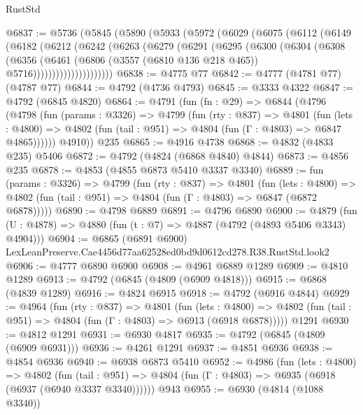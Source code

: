 \begin{lexlean}{RustStd}
\begin{coremodule}
@6837 := @5736
    (@5845
      (@5890
        (@5933
          (@5972
            (@6029
              (@6075
                (@6112
                  (@6149
                    (@6182
                      (@6212
                        (@6242
                          (@6263
                            (@6279
                              (@6291
                                (@6295
                                  (@6300
                                    (@6304
                                      (@6308
                                        (@6356
                                          (@6461
                                            (@6806
                                              (@3557 (@6810 @136 @218 @465))
                                              @5716)))))))))))))))))))))
@6838 := @4775 @77
@6842 := @4777 (@4781 @77) (@4787 @77)
@6844 := @4792 (@4736 @4793)
@6845 := @3333 @4322
@6847 := @4792 (@6845 @4820)
@6864 := @4791
    (fun (fn : @29) =>
    @6844
      (@4796
        (@4798
          (fun (params : @3326) =>
          @4799
            (fun (rty : @837) =>
            @4801
              (fun (lets : @4800) =>
              @4802 (fun (tail : @951) => @4804 (fun (Γ : @4803) => @6847 @4865))))))
        @4910))
    @235
@6865 := @4916 @4738
@6868 := @4832 (@4833 @235) @5406
@6872 := @4792 (@4824 (@6868 @4840) @4844)
@6873 := @4856 @235
@6878 := @4853 (@4855 @6873 @5410 @3337 @3340)
@6889 := fun (params : @3326) =>
  @4799
    (fun (rty : @837) =>
    @4801
      (fun (lets : @4800) =>
      @4802 (fun (tail : @951) => @4804 (fun (Γ : @4803) => @6847 (@6872 @6878)))))
@6890 := @4798 @6889
@6891 := @4796 @6890
@6900 := @4879 (fun (U : @4878) => @4880 (fun (t : @7) => @4887 (@4792 (@4893 @5406 @3343) @4904)))
@6904 := @6865 (@6891 @6900) LexLeanPreserve.Cae4456d77aa62528ed0bd9d0612cd278.R38.RustStd.look2
@6906 := @4777 @6890 @6900
@6908 := @4961 @6889 @1289
@6909 := @4810 @1289
@6913 := @4792 (@6845 (@4809 (@6909 @4818)))
@6915 := @6868 (@4839 @1289)
@6916 := @4824 @6915
@6918 := @4792 (@6916 @4844)
@6929 := @4964
    (fun (rty : @837) =>
    @4801
      (fun (lets : @4800) =>
      @4802 (fun (tail : @951) => @4804 (fun (Γ : @4803) => @6913 (@6918 @6878)))))
    @1291
@6930 := @4812 @1291
@6931 := @6930 @4817
@6935 := @4792 (@6845 (@4809 (@6909 @6931)))
@6936 := @4261 @1291
@6937 := @4851 @6936
@6938 := @4854 @6936
@6940 := @6938 @6873 @5410
@6952 := @4986
    (fun (lets : @4800) =>
    @4802
      (fun (tail : @951) => @4804 (fun (Γ : @4803) => @6935 (@6918 (@6937 (@6940 @3337 @3340))))))
    @943
@6955 := @6930 (@4814 (@1088 @3340))

\end{coremodule}
\end{lexlean}

